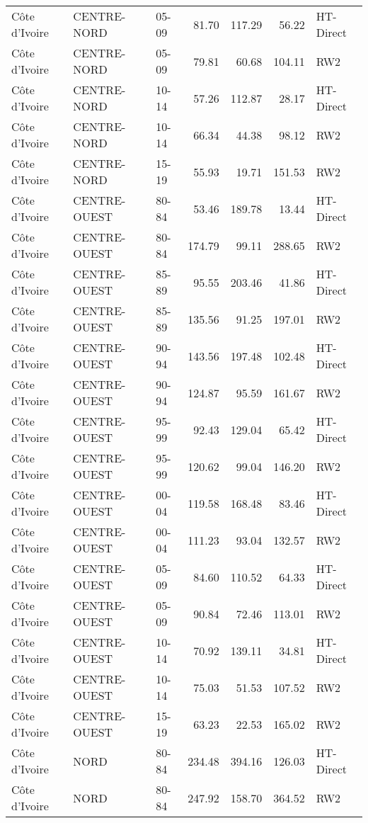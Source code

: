 \begin{longtable}{lllrrrl}
  C\^{o}te d'Ivoire & CENTRE-NORD & 05-09 & 81.70 & 117.29 & 56.22 & HT-Direct \\ 
  C\^{o}te d'Ivoire & CENTRE-NORD & 05-09 & 79.81 & 60.68 & 104.11 & RW2 \\ 
  C\^{o}te d'Ivoire & CENTRE-NORD & 10-14 & 57.26 & 112.87 & 28.17 & HT-Direct \\ 
  C\^{o}te d'Ivoire & CENTRE-NORD & 10-14 & 66.34 & 44.38 & 98.12 & RW2 \\ 
  C\^{o}te d'Ivoire & CENTRE-NORD & 15-19 & 55.93 & 19.71 & 151.53 & RW2 \\ 
  C\^{o}te d'Ivoire & CENTRE-OUEST & 80-84 & 53.46 & 189.78 & 13.44 & HT-Direct \\ 
  C\^{o}te d'Ivoire & CENTRE-OUEST & 80-84 & 174.79 & 99.11 & 288.65 & RW2 \\ 
  C\^{o}te d'Ivoire & CENTRE-OUEST & 85-89 & 95.55 & 203.46 & 41.86 & HT-Direct \\ 
  C\^{o}te d'Ivoire & CENTRE-OUEST & 85-89 & 135.56 & 91.25 & 197.01 & RW2 \\ 
  C\^{o}te d'Ivoire & CENTRE-OUEST & 90-94 & 143.56 & 197.48 & 102.48 & HT-Direct \\ 
  C\^{o}te d'Ivoire & CENTRE-OUEST & 90-94 & 124.87 & 95.59 & 161.67 & RW2 \\ 
  C\^{o}te d'Ivoire & CENTRE-OUEST & 95-99 & 92.43 & 129.04 & 65.42 & HT-Direct \\ 
  C\^{o}te d'Ivoire & CENTRE-OUEST & 95-99 & 120.62 & 99.04 & 146.20 & RW2 \\ 
  C\^{o}te d'Ivoire & CENTRE-OUEST & 00-04 & 119.58 & 168.48 & 83.46 & HT-Direct \\ 
  C\^{o}te d'Ivoire & CENTRE-OUEST & 00-04 & 111.23 & 93.04 & 132.57 & RW2 \\ 
  C\^{o}te d'Ivoire & CENTRE-OUEST & 05-09 & 84.60 & 110.52 & 64.33 & HT-Direct \\ 
  C\^{o}te d'Ivoire & CENTRE-OUEST & 05-09 & 90.84 & 72.46 & 113.01 & RW2 \\ 
  C\^{o}te d'Ivoire & CENTRE-OUEST & 10-14 & 70.92 & 139.11 & 34.81 & HT-Direct \\ 
  C\^{o}te d'Ivoire & CENTRE-OUEST & 10-14 & 75.03 & 51.53 & 107.52 & RW2 \\ 
  C\^{o}te d'Ivoire & CENTRE-OUEST & 15-19 & 63.23 & 22.53 & 165.02 & RW2 \\ 
  C\^{o}te d'Ivoire & NORD & 80-84 & 234.48 & 394.16 & 126.03 & HT-Direct \\ 
  C\^{o}te d'Ivoire & NORD & 80-84 & 247.92 & 158.70 & 364.52 & RW2 \\ 

\end{longtable}

